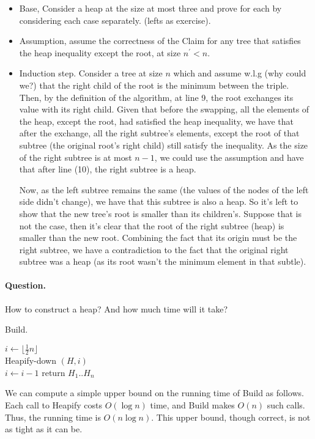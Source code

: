 \begin{itemize} 
  \item Base, Consider a heap at the size at most three and prove for each by considering each case separately. (lefts as exercise).  
  \item Assumption, assume the correctness of the Claim for any tree that satisfies the heap inequality except the root, at size $n^{\prime} < n$. 
  \item Induction step. Consider a tree at size $n$ which and assume w.l.g (why could we?) that the right child of the root is the minimum between the triple. Then, by the definition of the algorithm, at line 9, the root exchanges its value with its right child. Given that before the swapping, all the elements of the heap, except the root, had satisfied the heap inequality, we have that after the exchange, all the right subtree's elements, except the root of that subtree (the original root's right child) still satisfy the inequality. As the size of the right subtree is at most $n-1$, we could use the assumption and have that after line (10), the right subtree is a heap.  
 
    Now, as the left subtree remains the same (the values of the nodes of the left side didn't change), we have that this subtree is also a heap. So it's left to show that the new tree's root is smaller than its children's. Suppose that is not the case, then it's clear that the root of the right subtree (heap) is smaller than the new root. Combining the fact that its origin must be the right subtree, we have a contradiction to the fact that the original right subtree was a heap (as its root wasn't the minimum element in that subtle).  
 
\end{itemize} 
\paragraph{Question.} How to construct a heap? And how much time will it take?   
\begin{algbox}{Build.}
\begin{algorithm}[H]
  $ i \leftarrow \lfloor \frac{1}{2}n  \rfloor $ \\
  { 
    Heapify-down $\left( H, i \right)$ \\ 
    $ i \leftarrow i - 1 $  
  }
return $H_{1} .. H_{n}$
\end{algorithm}
\end{algbox}
We can compute a simple upper bound on the running time of Build as follows. Each call to Heapify costs $O(\log n)$ time, and Build makes $O(n)$ such calls. Thus, the running time is $O(n \log n)$. This upper bound, though correct, is not as tight as it can be.

